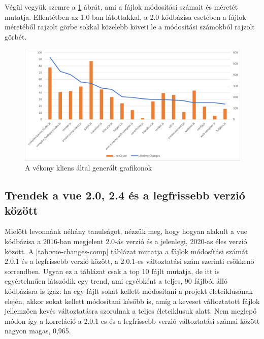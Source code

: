 Végül vegyük szemre a \ref{fig:vue2-lines-changes} ábrát, ami a fájlok módosítási számait és méretét mutatja. Ellentétben az 1.0-ban látottakkal, a 2.0 kódbázisa esetében a fájlok méretéből rajzolt görbe sokkal közelebb követi le a módosítási számokból rajzolt görbét.

\begin{figure}[H]
    \centering
    \includegraphics[width=1\textwidth]{images/vue/vue2-lines-lifetimechanges.png}
    \caption{A vékony kliens által generált grafikonok}
    \label{fig:vue2-lines-changes}
\end{figure}

\subsection{Trendek a vue 2.0, 2.4 és a legfrissebb verzió között}

Mielőtt levonnánk néhány tanulságot, nézzük meg, hogy hogyan alakult a vue kódbázisa a 2016-ban megjelent 2.0-ás verzió és a jelenlegi, 2020-as éles verzió között. A \ref{tab:vue-changes-comp} táblázat mutatja a fájlok módosítási számát 2.0.1 és a legfrissebb verzió között, a 2.0.1-es változtatási szám szerinti csökkenő sorrendben. Ugyan ez a táblázat csak a top 10 fájlt mutatja, de itt is egyértelműen látszódik egy trend, ami egyébként a teljes, 90 fájlból álló kódbázisra is igaz: ha egy fájlt sokat kellett módosítani a projekt életciklusának elején, akkor sokat kellett módosítani később is, amíg a keveset változtatott fájlok jellemzően kevés változtatásra szorulnak a teljes életciklusuk alatt. Nem meglepő módon így a korreláció a 2.0.1-es és a legfrissebb verzió változtatási számai között nagyon magas, 0,965.

